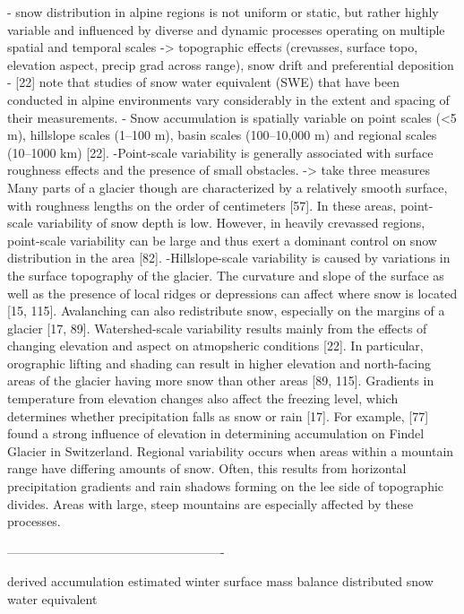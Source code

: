 \documentclass[twocolumn,letterpaper]{igs}
\begin{document}
- snow distribution in alpine regions is not uniform or static, but
rather highly variable and influenced by diverse and dynamic processes operating on multiple spatial and temporal scales -> topographic effects (crevasses, surface topo, elevation aspect, precip grad across range), snow drift and preferential deposition
-  [22] note that studies of snow water equivalent (SWE) that have been conducted in
alpine environments vary considerably in the extent and spacing of their measurements.
- Snow accumulation is spatially variable on point scales (<5 m), hillslope scales (1–100 m),
basin scales (100–10,000 m) and regional scales (10–1000 km) [22].
-Point-scale variability is generally associated with surface roughness effects and the
presence of small obstacles. -> take three measures
Many parts of a glacier though
are characterized by a relatively smooth surface, with roughness lengths on the order of
centimeters [57]. In these areas, point-scale variability of snow depth is low. However, in
heavily crevassed regions, point-scale variability can be large and thus exert a dominant
control on snow distribution in the area [82].
-Hillslope-scale variability is caused by variations in the surface topography of the glacier.
The curvature and slope of the surface as well as the presence of local ridges or depressions
can affect where snow is located [15, 115]. Avalanching can also redistribute snow, especially
on the margins of a glacier [17, 89].
Watershed-scale variability results mainly from the effects of changing elevation and
aspect on atmopsheric conditions [22]. In particular, orographic lifting and shading can
result in higher elevation and north-facing areas of the glacier having more snow than other
areas [89, 115]. Gradients in temperature from elevation changes also affect the freezing
level, which determines whether precipitation falls as snow or rain [17]. For example, [77]
found a strong influence of elevation in determining accumulation on Findel Glacier in
Switzerland.
Regional variability occurs when areas within a mountain range have differing amounts of
snow. Often, this results from horizontal precipitation gradients and rain shadows forming
on the lee side of topographic divides. Areas with large, steep mountains are especially
affected by these processes.

----------------------------------------------------

derived accumulation
estimated winter surface mass balance
distributed snow water equivalent







\end{document}
